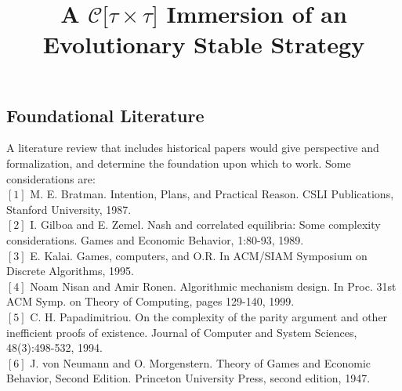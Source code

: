 \documentclass[10pt,twoside,a4paper]{article}
\begin{document}
\title{A $\mathcal{C}\lbrack\tau \times \tau\rbrack$ Immersion of an
Evolutionary Stable Strategy}


\maketitle
\pagestyle{plain}


\cleardoublepage

\pagestyle{fancy}







%

%

\subsection{Foundational Literature}

A literature review that includes historical
papers would give perspective and formalization, and determine the foundation
upon which to work. Some considerations are:\\
$[1]$ M. E. Bratman. Intention, Plans, and Practical Reason. CSLI Publications, Stanford University, 1987.\\
$[2]$ I. Gilboa and E. Zemel. Nash and correlated equilibria: Some complexity
considerations. Games and Economic Behavior, 1:80-93, 1989.\\
$[3]$ E. Kalai. Games, computers, and O.R. In ACM/SIAM Symposium on Discrete Algorithms, 1995.\\
$[4]$ Noam Nisan and Amir Ronen. Algorithmic mechanism design. In Proc. 31st ACM Symp. on
Theory of Computing, pages 129-140, 1999.\\
$[5]$ C. H. Papadimitriou. On the complexity of the parity argument and other
inefficient proofs of existence. Journal of Computer and System Sciences, 48(3):498-532, 1994.\\
$[6]$ J. von Neumann and O. Morgenstern. Theory of Games and Economic Behavior, Second Edition. Princeton University Press, second edition, 1947.\\




\end{document}
